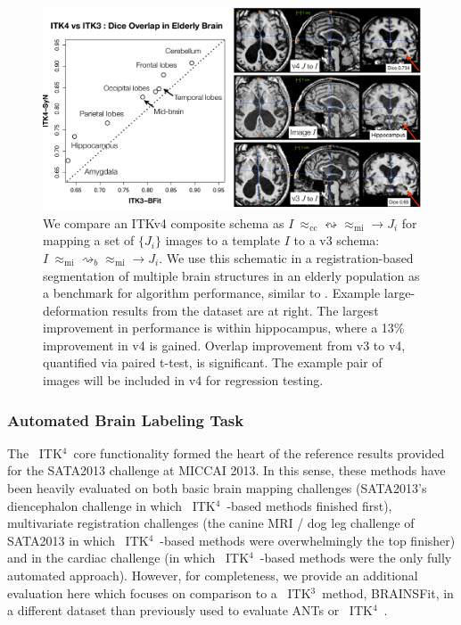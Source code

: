 \documentclass{frontiersSCNS}
\newcommand{\tk}{~ITK$^{\text{4}}$~}
\newcommand{\tkt}{~ITK$^{\text{3}}$~}
\begin{document}
\begin{figure}[t]
\begin{center}
\includegraphics[width=4.5in]{figs/eval.pdf}
\caption{We compare an ITKv4 composite schema as $I
~\approx_\text{cc}  \leftrightsquigarrow \approx_\text{mi}  \rightarrow
J_i $ for mapping a set of $\{ J_i \}$ images
to a template $I$ to a v3 schema:  $I
~\approx_\text{mi} \rightsquigarrow_b    \approx_\text{mi}  \rightarrow
J_i $.  We use this schematic in a registration-based
segmentation of multiple brain structures in an elderly population as a benchmark
for algorithm performance, similar to \cite{Klein2010}.  Example
large-deformation results from the dataset are at right.  The largest
improvement in performance is within hippocampus, where a 13\%
improvement in v4 is gained.  Overlap improvement from v3 to v4, quantified via
paired t-test, is significant.  The example pair of images will be
included in v4 for regression testing.}
\label{fig:eval}
\end{center}
\end{figure}

\subsubsection{Automated Brain Labeling Task}
The \tk core functionality formed the heart of the reference results
provided for the SATA2013 challenge at MICCAI 2013.  In this sense,
these methods have been heavily evaluated on both basic brain mapping
challenges (SATA2013's diencephalon challenge in which \tk-based
methods finished first), multivariate
registration challenges (the canine MRI / dog leg challenge of
SATA2013 in which \tk-based methods were overwhelmingly the top
finisher) and in the cardiac challenge (in which \tk-based methods
were the only fully automated approach).  However, for completeness,
we provide an additional evaluation here which focuses on comparison
to a \tkt method, BRAINSFit, in a different dataset than previously
used to evaluate ANTs or \tk.
\end{document}
